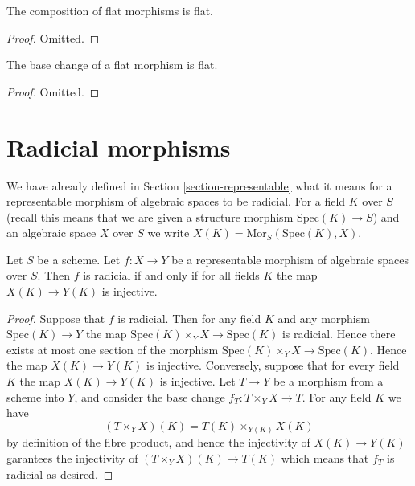 \begin{lemma}
\label{lemma-composition-flat}
The composition of flat morphisms is flat.
\end{lemma}

\begin{proof}
Omitted.
\end{proof}

\begin{lemma}
\label{lemma-base-change-flat}
The base change of a flat morphism is flat.
\end{lemma}

\begin{proof}
Omitted.
\end{proof}












\section{Radicial morphisms}
\label{section-radicial}

\noindent
We have already defined in Section \ref{section-representable}
what it means for a representable morphism of algebraic spaces
to be radicial. For a field $K$ over $S$ (recall this means that
we are given a structure morphism $\text{Spec}(K) \to S$) and an
algebraic space $X$ over $S$ we write
$X(K) = \text{Mor}_S(\text{Spec}(K), X)$.

\begin{lemma}
\label{lemma-radical-representable}
Let $S$ be a scheme. Let $f : X \to Y$ be a representable
morphism of algebraic spaces over $S$. Then
$f$ is radicial if and only if for all fields $K$ the
map $X(K) \to Y(K)$ is injective.
\end{lemma}

\begin{proof}
Suppose that $f$ is radicial. Then for any field $K$ and any morphism
$\text{Spec}(K) \to Y$ the map $\text{Spec}(K) \times_Y X \to \text{Spec}(K)$
is radicial. Hence there exists at most one section of the morphism
$\text{Spec}(K) \times_Y X \to \text{Spec}(K)$. Hence the map
$X(K) \to Y(K)$ is injective. Conversely, suppose that for every field $K$
the map $X(K) \to Y(K)$ is injective. Let $T \to Y$ be a morphism from a
scheme into $Y$, and consider the base change $f_T : T \times_Y X \to T$.
For any field $K$ we have
$$
(T \times_Y X)(K) = T(K) \times_{Y(K)} X(K)
$$
by definition of the fibre product, and hence the injectivity of
$X(K) \to Y(K)$ garantees the injectivity of
$(T \times_Y X)(K) \to T(K)$ which means that $f_T$ is radicial as desired.
\end{proof}

